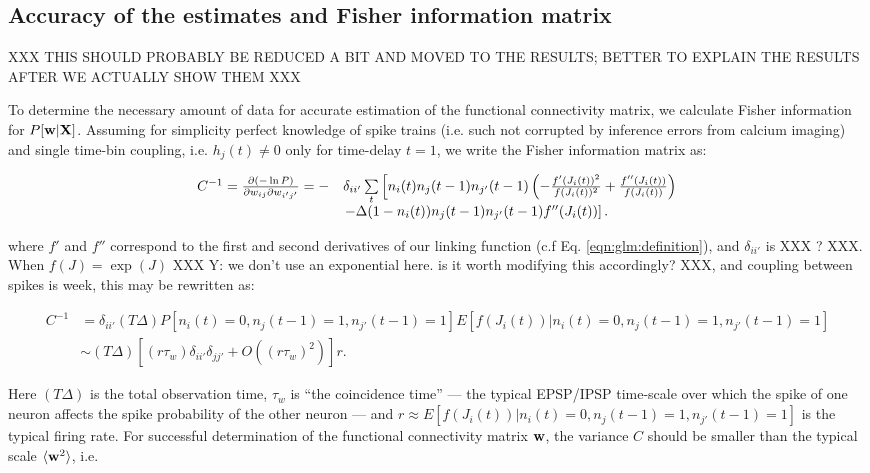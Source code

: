 \subsection{Accuracy of the estimates and Fisher information matrix} \label{sec:methods:accuracy_Fisher}

XXX THIS SHOULD PROBABLY BE REDUCED A BIT AND MOVED TO THE RESULTS;
BETTER TO EXPLAIN THE RESULTS AFTER WE ACTUALLY SHOW THEM XXX

To determine the necessary amount of data for accurate estimation of
the functional connectivity matrix, we calculate Fisher information
for $P[\mathbf{w}| {\bf X}]$. Assuming for simplicity perfect knowledge of spike
trains (i.e. such not corrupted by inference errors from calcium
imaging) and single time-bin coupling, i.e. $h_{j}(t)\neq 0$ only for
time-delay $t=1$, we write the Fisher information matrix as:

\begin{equation}
\begin{array}{rl}
C^{-1}=\frac{\partial (-\ln P)}{\partial \w_{ij}\partial \w_{i'j'}}
=-&\delta_{ii'}\sum\limits_t\left[
n_i(t)n_{j}(t-1)n_{j'}(t-1)\left(-\frac{f'(J_i(t))^2}{f(J_i(t))^2} +
\frac{f''(J_i(t))}{f(J_i(t))}\right) \right. \\
&\left.-\Delta (1-n_i(t))n_{j}(t-1)n_{j'}(t-1)f''(J_i(t))\right].
\end{array}
\end{equation}

 where $f'$ and $f''$ correspond to the first and second derivatives of our linking function (c.f Eq. \eqref{eqn:glm:definition}), and $\delta_{ii'}$ is XXX ? XXX.  When $f(J)=\exp(J)$ XXX Y: we don't use an exponential here.  is it worth modifying this accordingly? XXX, and coupling between spikes is week, this may be rewritten as:

\begin{equation}\label{eqn:fisher}
\begin{array}{rl}
C^{-1}
&=\delta_{ii'} (T\Delta) P[n_i(t)=0, n_j(t-1)=1, n_{j'}(t-1)=1]E[f(J_i(t))|n_i(t)=0, n_j(t-1)=1, n_{j'}(t-1)=1] \\
&\sim (T\Delta)\left[(r \tau_w)\delta_{ii'}\delta_{jj'}+O((r \tau_w)^2)\right]r.
\end{array}
\end{equation}

Here $(T\Delta)$ is the total observation time, $ \tau_w$ is ``the coincidence time'' --- the typical EPSP/IPSP time-scale over which the spike of one neuron affects the spike probability of the other neuron --- and $r \approx E[f(J_i(t))|n_i(t)=0, n_j(t-1)=1, n_{j'}(t-1)=1]$ is the typical firing rate.  For successful determination of the functional connectivity matrix $\mathbf{w}$, the variance $C$ should be smaller than the typical scale $\langle \mathbf{w}^2\rangle$, i.e.

